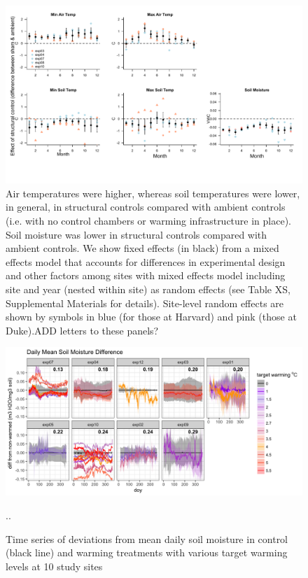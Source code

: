 \documentclass{article}
\begin{document}
 \begin{figure}[p]
\centering
 \includegraphics{../Analyses/figures/ShamVSAmbient_all.pdf}  
 \caption{Air temperatures were higher, whereas soil temperatures were lower, in general, in structural controls compared with ambient controls (i.e. with no control chambers or warming infrastructure in place). Soil moisture was lower in structural controls compared with ambient controls. We show fixed effects (in black) from a mixed effects model that accounts for differences in experimental design and other factors among sites with mixed effects model including site and year (nested within site) as random effects (see Table XS, Supplemental Materials for details). Site-level random effects are shown by symbols in blue (for those at Harvard) and pink (those at Duke).ADD letters to these panels?}
 \label{fig:shamamb}
 \end{figure}
\clearpage
 \begin{figure}[h]
    \centering
 \includegraphics{../Analyses/figures/Exploratory_TimeSeries_SoilMoist_Deviation.png}  
 \caption{Time series of deviations from mean daily soil moisture in control (black line) and warming treatments with various target warming levels at 10 study sites}..%
 \label{fig:mois}
 \end{figure}
\end{document}
